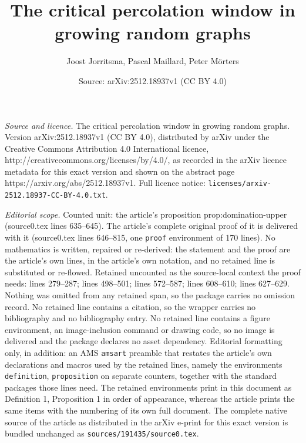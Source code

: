 \documentclass[10pt,a4paper]{amsart}
\title{The critical percolation window in growing random graphs}
\author{Joost Jorritsma, Pascal Maillard, Peter M\"orters}
\date{Source: arXiv:2512.18937v1 (CC BY 4.0)}
\begin{document}
\maketitle

\noindent\emph{Source and licence.} The critical percolation window in growing random graphs. Version arXiv:2512.18937v1 (CC BY 4.0), distributed by arXiv under the Creative Commons Attribution 4.0 International licence, http://creativecommons.org/licenses/by/4.0/, as recorded in the arXiv licence metadata for this exact version and shown on the abstract page https://arxiv.org/abs/2512.18937v1. Full licence notice: \texttt{licenses/arxiv-2512.18937-CC-BY-4.0.txt}.\par\smallskip

\noindent\textit{Editorial scope.} Counted unit: the article's proposition prop:domination-upper (source0.tex lines 635--645). The article's complete original proof of it is delivered with it (source0.tex lines 646--815, one \texttt{proof} environment of 170 lines). No mathematics is written, repaired or re-derived: the statement and the proof are the article's own lines, in the article's own notation, and no retained line is substituted or re-flowed.  Retained uncounted as the source-local context the proof needs: lines 279--287; lines 498--501; lines 572--587; lines 608--610; lines 627--629.  Nothing was omitted from any retained span, so the package carries no omission record.  No retained line contains a citation, so the wrapper carries no bibliography and no bibliography entry.  No retained line contains a figure environment, an image-inclusion command or drawing code, so no image is delivered and the package declares no asset dependency.  Editorial formatting only, in addition: an AMS \texttt{amsart} preamble that restates the article's own declarations and macros used by the retained lines, namely the environments \texttt{definition}, \texttt{proposition} on separate counters, together with the standard packages those lines need.  The retained environments print in this document as Definition 1, Proposition 1 in order of appearance, whereas the article prints the same items with the numbering of its own full document.  The complete native source of the article as distributed in the arXiv e-print for this exact version is bundled unchanged as \texttt{sources/191435/source0.tex}.
\end{document}
